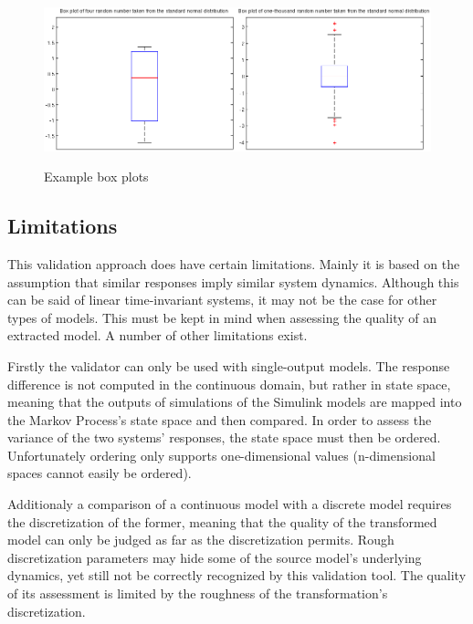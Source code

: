 \begin{figure}
\begin{center}
\includegraphics[width=16cm]{media/boxplotexample}\\
\end{center}
\caption{Example box plots}
\label{boxplotexample}
\end{figure}


\subsection{Limitations}

This validation approach does have certain limitations. Mainly it is based on the assumption that similar responses imply similar system dynamics. Although this can be said of linear time-invariant systems, it may not be the case for other types of models. This must be kept in mind when assessing the quality of an extracted model. A number of other limitations exist.

Firstly the validator can only be used with single-output models. The response difference is not computed in the continuous domain, but rather in state space, meaning that the outputs of simulations of the Simulink models are mapped into the Markov Process's state space and then compared. In order to assess the variance of the two systems' responses, the state space must then be ordered. Unfortunately ordering only supports one-dimensional values (n-dimensional spaces cannot easily be ordered).

Additionaly a comparison of a continuous model with a discrete model requires the discretization of the former, meaning that the quality of the transformed model can only be judged as far as the discretization permits. Rough discretization parameters may hide some of the source model's underlying dynamics, yet still not be correctly recognized by this validation tool. The quality of its assessment is limited by the roughness of the transformation's discretization.

